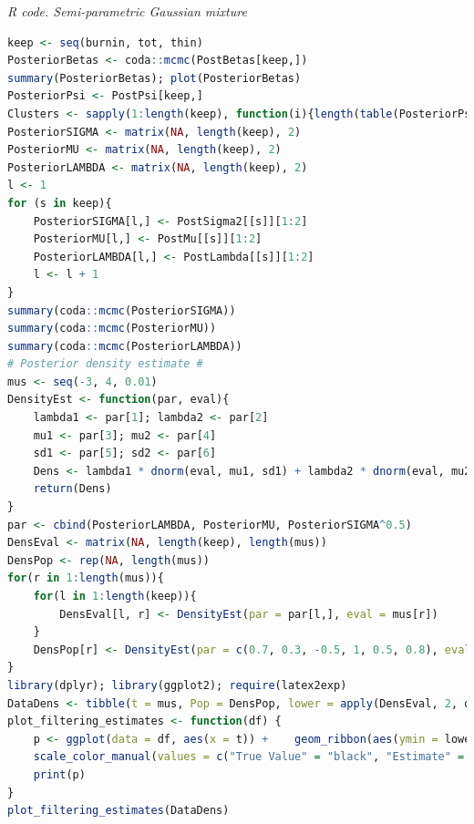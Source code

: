 \begin{enumerate}[leftmargin=*]
\begin{tcolorbox}[enhanced,width=4.67in,center upper,
	fontupper=\large\bfseries,drop shadow southwest,sharp corners]
	\textit{R code. Semi-parametric Gaussian mixture}
	\begin{VF}
		\begin{lstlisting}[language=R]
keep <- seq(burnin, tot, thin)
PosteriorBetas <- coda::mcmc(PostBetas[keep,])
summary(PosteriorBetas); plot(PosteriorBetas)
PosteriorPsi <- PostPsi[keep,]
Clusters <- sapply(1:length(keep), function(i){length(table(PosteriorPsi[i,]))})
PosteriorSIGMA <- matrix(NA, length(keep), 2)
PosteriorMU <- matrix(NA, length(keep), 2)
PosteriorLAMBDA <- matrix(NA, length(keep), 2)
l <- 1
for (s in keep){
	PosteriorSIGMA[l,] <- PostSigma2[[s]][1:2]
	PosteriorMU[l,] <- PostMu[[s]][1:2]
	PosteriorLAMBDA[l,] <- PostLambda[[s]][1:2]
	l <- l + 1
}
summary(coda::mcmc(PosteriorSIGMA))
summary(coda::mcmc(PosteriorMU))
summary(coda::mcmc(PosteriorLAMBDA))
# Posterior density estimate #
mus <- seq(-3, 4, 0.01)
DensityEst <- function(par, eval){
	lambda1 <- par[1]; lambda2 <- par[2]
	mu1 <- par[3]; mu2 <- par[4]
	sd1 <- par[5]; sd2 <- par[6]
	Dens <- lambda1 * dnorm(eval, mu1, sd1) + lambda2 * dnorm(eval, mu2, sd2)
	return(Dens)
}
par <- cbind(PosteriorLAMBDA, PosteriorMU, PosteriorSIGMA^0.5)
DensEval <- matrix(NA, length(keep), length(mus))
DensPop <- rep(NA, length(mus))
for(r in 1:length(mus)){
	for(l in 1:length(keep)){
		DensEval[l, r] <- DensityEst(par = par[l,], eval = mus[r])
	}
	DensPop[r] <- DensityEst(par = c(0.7, 0.3, -0.5, 1, 0.5, 0.8), eval = mus[r]) 
}
library(dplyr); library(ggplot2); require(latex2exp)
DataDens <- tibble(t = mus, Pop = DensPop, lower = apply(DensEval, 2, quantile, probs = 0.025), upper = apply(DensEval, 2, quantile, probs = 0.975), meanT = colMeans(DensEval))
plot_filtering_estimates <- function(df) {
	p <- ggplot(data = df, aes(x = t)) + 	geom_ribbon(aes(ymin = lower, ymax = upper), alpha = 1, fill = "lightblue") + 	geom_line(aes(y = Pop, color = "True Value"), linewidth = 0.5) + 	geom_line(aes(y = meanT, color = "Estimate"), linewidth = 0.5) +
	scale_color_manual(values = c("True Value" = "black", "Estimate" = "blue")) + xlab(TeX("$\\mu$")) + ylab("Density") + 	labs(title = "Density: Stochastic Errors", color = "") + theme_minimal()
	print(p)
}
plot_filtering_estimates(DataDens)
\end{lstlisting}
	\end{VF}
\end{tcolorbox}


\end{enumerate}
